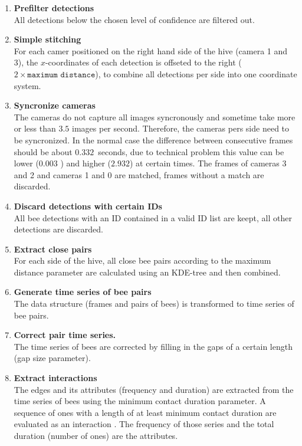 \begin{enumerate}
\item \textbf{Prefilter detections}\\
All detections below the chosen level of confidence are filtered out.

\item \textbf{Simple stitching}\\
For each camer positioned on the right hand side of the hive (camera 1 and 3), the $x$-coordinates of each detection is offseted to the right ($2\times \texttt{maximum distance}$), to combine all detections per side into one coordinate system.

\item \textbf{Syncronize cameras}\\
The cameras do not capture all images syncronously and sometime take more or less than $3.5$ images per second.
Therefore, the cameras pers side need to be syncronized. In the normal case the difference between consecutive frames should be about $0.332$~seconds, due to technical problem this value can be lower ($0.003$ ) and higher ($2.932$) at certain times. The frames of cameras 3 and 2 and cameras 1 and 0 are matched, frames without a match are discarded.

\item \textbf{Discard detections with certain IDs}\\
All bee detections with an ID contained in a valid ID list are keept, all other detections are discarded.

\item \textbf{Extract close pairs}\\
For each side of the hive, all close bee pairs according to the maximum distance parameter are calculated using an KDE-tree and then combined.

\item \textbf{Generate time series of bee pairs}\\
The data structure (frames and pairs of bees) is transformed to time series of bee pairs.

\item \textbf{Correct pair time series.}\\
The time series of bees are corrected by filling in the gaps of a certain length (gap size parameter).

\item \textbf{Extract interactions}\\
The edges and its attributes (frequency and duration) are extracted from the time series of bees using the minimum contact duration parameter. A sequence of ones with a length of at least minimum contact duration are evaluated as an interaction . The frequency of those series and the total duration (number of ones) are the attributes.
\end{enumerate}
